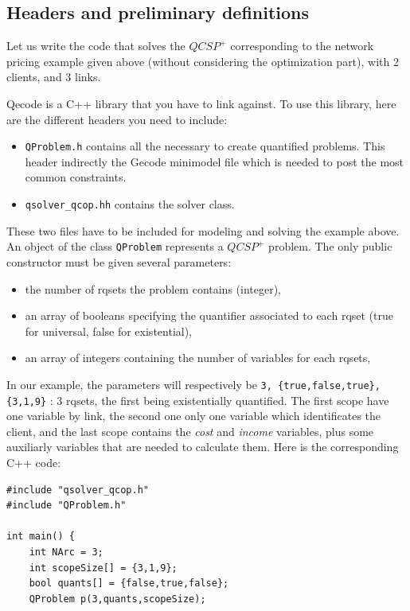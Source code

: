 \documentclass{article}
\begin{document}
 
\subsection{Headers and preliminary definitions}
Let us write the code that solves the  $QCSP^+$ corresponding to the network pricing example given above (without considering the optimization part), with 2 clients, and 3 links.

Qecode is a C++ library that you have to link against. To use this library, here are the different headers you need to include: 
\begin{itemize}
\item {\tt QProblem.h} contains all the necessary to create quantified problems. This header indirectly the Gecode minimodel file which is needed to post the most common constraints. 
\item {\tt qsolver\_qcop.hh} contains the solver class.
\end{itemize}
These two files have to be included for modeling and solving the example above.  An object of the class {\tt QProblem} represents a $QCSP^+$ problem. The only public constructor must be given several parameters: 
\begin{itemize}
\item the number of rqsets the problem contains (integer), 
\item an array of booleans specifying the quantifier associated to each rqset (true for universal, false for existential), 
\item an array of integers containing the number of variables for each rqsets, 
\end{itemize}
In our example, the parameters will respectively be {\tt 3, \{true,false,true\}, \{3,1,9\}}  : 3 rqsets, the first being existentially quantified. The first scope have one variable by link, the second one only one variable which identificates the client, and the last scope contains the {\em cost} and {\em income} variables, plus some auxiliarly variables that are needed to calculate them.  Here is the corresponding C++ code: 
{\small
\begin{verbatim}
#include "qsolver_qcop.h"
#include "QProblem.h"

int main() {
    int NArc = 3;
    int scopeSize[] = {3,1,9};
    bool quants[] = {false,true,false};
    QProblem p(3,quants,scopeSize);
\end{verbatim}
}
\end{document}
